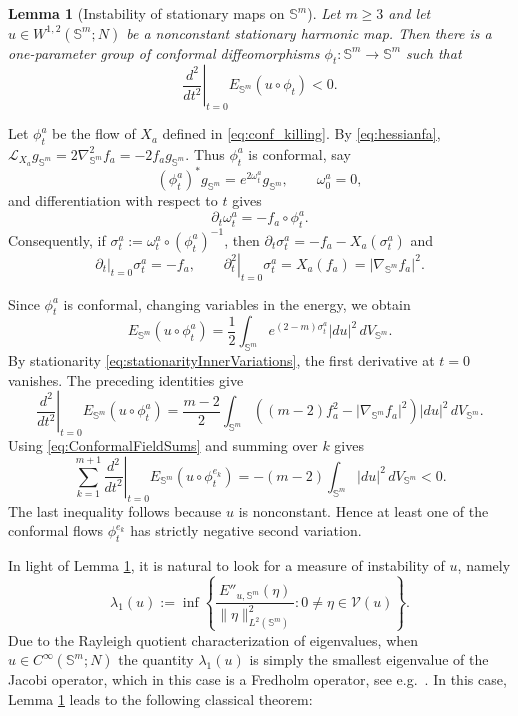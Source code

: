 \documentclass[11pt]{article}
\theoremstyle{plain}
\numberwithin{equation}{section}
\newtheorem{lemma}[theorem]{Lemma}
\theoremstyle{definition}
\newtheorem{remark}[theorem]{Remark}
\let\oldendproof\endproof
\renewenvironment{proof}[1][\proofname]{%
\oldproof[\upshape \bfseries #1]%
}{\oldendproof}
\def \p{\partial}
\def \mc{\mathcal}
\def \mb{\mathbb}
\begin{document}
\begin{lemma}[Instability of stationary maps on $\mb S^m$]
\label{lem:ConformalInstability}
Let $m\geq3$ and let $u\in W^{1,2}(\mb S^m;N)$ be a nonconstant
stationary harmonic map.  Then there is a one-parameter group of
conformal diffeomorphisms
$\phi_t\colon\mb S^m\to\mb S^m$ such that
\[
    \left.\frac{d^2}{dt^2}\right|_{t=0}E_{\mb S^m}(u\circ\phi_t)<0.
\]
\end{lemma}

\begin{proof}
Let $\phi_t^a$ be the flow of $X_a$ defined in \eqref{eq:conf_killing}.
By \eqref{eq:hessianfa},
$\mathcal L_{X_a}g_{\mb S^m}=2\nabla_{\mb S^m}^2f_a
=-2f_ag_{\mb S^m}$.  Thus $\phi_t^a$ is
conformal, say
\[
    (\phi_t^a)^*g_{\mb S^m}=e^{2\omega_t^a}g_{\mb S^m},
    \qquad \omega_0^a=0,
\]
and differentiation with respect to $t$ gives
\[
    \partial_t\omega_t^a=-f_a\circ\phi_t^a.
\]
Consequently, if $\sigma_t^a:=\omega_t^a\circ(\phi_t^a)^{-1}$, then $\p_t \sigma_t^a = -f_a - X_a(\sigma_t^a)$ and 
\[
    \left.\partial_t\right|_{t=0}\sigma_t^a=-f_a,
    \qquad
    \left.\partial_t^2\right|_{t=0}\sigma_t^a=X_a(f_a)
    =|\nabla_{\mb S^m}f_a|^2.
\]

Since $\phi_t^a$ is conformal, changing variables in the energy, we obtain
\[
    E_{\mb S^m}(u\circ\phi_t^a)
    =\frac12\int_{\mb S^m}
      e^{(2-m)\sigma_t^a}
      |du|^2\,dV_{\mb S^m}.
\]
By stationarity \eqref{eq:stationarityInnerVariations}, the first
derivative at $t=0$ vanishes.  The preceding identities give
\[
\left.\frac{d^2}{dt^2}\right|_{t=0}E_{\mb S^m}(u\circ\phi_t^a)
{}=\frac{m-2}{2}\int_{\mb S^m}
 \left((m-2)f_a^2-|\nabla_{\mb S^m}f_a|^2\right)
 |du|^2\,dV_{\mb S^m}.
\]
Using \eqref{eq:ConformalFieldSums} and summing over $k$ gives
\[
    \sum_{k=1}^{m+1}
    \left.\frac{d^2}{dt^2}\right|_{t=0}
      E_{\mb S^m}(u\circ\phi_t^{e_k})
    =-(m-2)\int_{\mb S^m}|du|^2\,dV_{\mb S^m}<0.
\]
The last inequality follows because $u$ is nonconstant.  Hence at least
one of the conformal flows $\phi_t^{e_k}$ has strictly negative second
variation.
\end{proof}


In light of Lemma \ref{lem:ConformalInstability}, it is natural to look for a measure of instability of $u$, namely
\begin{equation}
    \label{eq:deflambdaone}
    \lambda_1(u)
    :=\inf\left\{
    \frac{E''_{u,\mb S^m}(\eta)}{\|\eta\|_{L^2(\mb S^m)}^2}:
    0\neq\eta\in\mc V(u)
    \right\}.
\end{equation}
Due to the Rayleigh quotient characterization of eigenvalues, when $u\in C^\infty(\mb S^m;N)$ the quantity $\lambda_1(u)$ is simply the smallest eigenvalue of the Jacobi operator, which in this case is a Fredholm operator, see e.g.\ \cite[Proposition 6.1]{Hardt1992a}. In this case, Lemma \ref{lem:ConformalInstability} leads to the following classical theorem:
\end{document}
